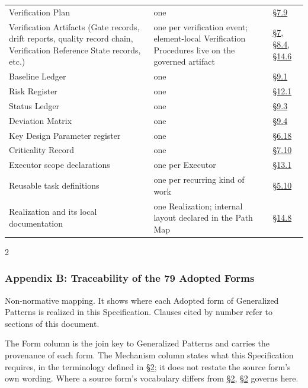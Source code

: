 \begin{longtable}{@{}p{} p{} p{}@{}}
Verification Plan & one & \hyperlink{nss-7.9}{\S7.9} \\

Verification Artifacts (Gate records, drift reports, quality record chain, Verification Reference State records, etc.) & one per verification event; element-local Verification Procedures live on the governed artifact & \hyperlink{nss-7}{\S7}, \hyperlink{nss-8.4}{\S8.4}, \hyperlink{nss-14.6}{\S14.6} \\

Baseline Ledger & one & \hyperlink{nss-9.1}{\S9.1} \\

Risk Register & one & \hyperlink{nss-12.1}{\S12.1} \\

Status Ledger & one & \hyperlink{nss-9.3}{\S9.3} \\

Deviation Matrix & one & \hyperlink{nss-9.4}{\S9.4} \\

Key Design Parameter register & one & \hyperlink{nss-6.18}{\S6.18} \\

Criticality Record & one & \hyperlink{nss-7.10}{\S7.10} \\

Executor scope declarations & one per Executor & \hyperlink{nss-13.1}{\S13.1} \\

Reusable task definitions & one per recurring kind of work & \hyperlink{nss-5.10}{\S5.10} \\

Realization and its local documentation & one Realization; internal layout declared in the Path Map & \hyperlink{nss-14.8}{\S14.8} \\

\bottomrule

\end{longtable}

\endgroup

\begin{multicols}{2}

\hypertarget{nss-appB}{}

\subsubsection*{Appendix B: Traceability of the 79 Adopted Forms}

Non-normative mapping. It shows where each Adopted form of Generalized Patterns is realized in this Specification. Clauses cited by number refer to sections of this document.

The Form column is the join key to Generalized Patterns and carries the provenance of each form. The Mechanism column states what this Specification requires, in the terminology defined in \hyperlink{nss-2}{\S2}; it does not restate the source form's own wording. Where a source form's vocabulary differs from \hyperlink{nss-2}{\S2}, \hyperlink{nss-2}{\S2} governs here.

\end{multicols}

